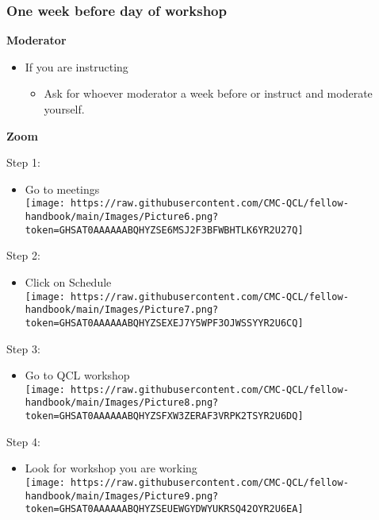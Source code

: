 \documentclass[
]{book}
\providecommand{\tightlist}{%
  \setlength{\itemsep}{0pt}\setlength{\parskip}{0pt}}
\begin{document}
\hypertarget{one-week-before-day-of-workshop}{%
\subsubsection{\texorpdfstring{One week before day of workshop }{One week before day of workshop }}\label{one-week-before-day-of-workshop}}

\textbf{Moderator}

\begin{itemize}
\tightlist
\item
  If you are instructing

  \begin{itemize}
  \tightlist
  \item
    Ask for whoever moderator a week before or instruct and moderate yourself.
  \end{itemize}
\end{itemize}

\textbf{Zoom}

Step 1:

\begin{itemize}
\tightlist
\item
  Go to meetings\\
  \texttt{[image: https://raw.githubusercontent.com/CMC-QCL/fellow-handbook/main/Images/Picture6.png?token=GHSAT0AAAAAABQHYZSE6MSJ2F3BFWBHTLK6YR2U27Q]}
\end{itemize}

Step 2:

\begin{itemize}
\tightlist
\item
  Click on Schedule\\
  \texttt{[image: https://raw.githubusercontent.com/CMC-QCL/fellow-handbook/main/Images/Picture7.png?token=GHSAT0AAAAAABQHYZSEXEJ7Y5WPF3OJWSSYYR2U6CQ]}
\end{itemize}

Step 3:

\begin{itemize}
\tightlist
\item
  Go to QCL workshop\\
  \texttt{[image: https://raw.githubusercontent.com/CMC-QCL/fellow-handbook/main/Images/Picture8.png?token=GHSAT0AAAAAABQHYZSFXW3ZERAF3VRPK2TSYR2U6DQ]}
\end{itemize}

Step 4:

\begin{itemize}
\tightlist
\item
  Look for workshop you are working\\
  \texttt{[image: https://raw.githubusercontent.com/CMC-QCL/fellow-handbook/main/Images/Picture9.png?token=GHSAT0AAAAAABQHYZSEUEWGYDWYUKRSQ42OYR2U6EA]}
\end{itemize}
\end{document}
